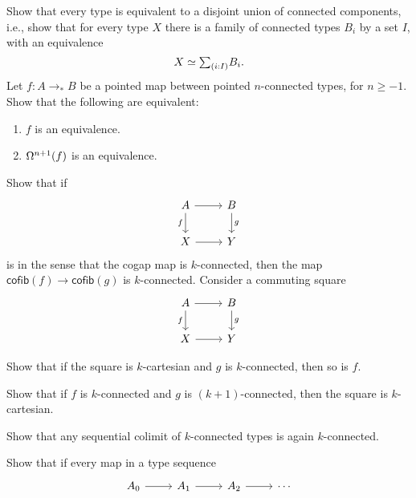 \begin{exercises}
  \exercise Show that every type is equivalent to a disjoint union of connected components, i.e., show that for every type $X$ there is a family of connected types $B_i$ by a set $I$, with an equivalence
  \begin{equation*}
    X \eqvsym \sm{i:I}B_i.
  \end{equation*}
\exercise Let $f:A\to_\ast B$ be a pointed map between pointed $n$-connected types, for $n\geq -1$. Show that the following are equivalent:
\begin{enumerate}
\item $f$ is an equivalence.
\item $\loopspace[n+1]{f}$ is an equivalence. 
\end{enumerate}
\exercise Show that if
\begin{equation*}
\begin{tikzcd}
A \arrow[r] \arrow[d,swap,"f"] & B \arrow[d,"g"] \\
X \arrow[r] & Y
\end{tikzcd}
\end{equation*}
is  in the sense that the cogap map is $k$-connected, then the map $\mathsf{cofib}(f)\to \mathsf{cofib}(g)$ is $k$-connected.
\exercise Consider a commuting square
\begin{equation*}
\begin{tikzcd}
A \arrow[d,swap,"f"] \arrow[r] & B \arrow[d,"g"] \\
X \arrow[r] & Y
\end{tikzcd}
\end{equation*}
\begin{subexenum}
\item Show that if the square is $k$-cartesian and $g$ is $k$-connected, then so is $f$.
\item Show that if $f$ is $k$-connected and $g$ is $(k+1)$-connected, then the square is $k$-cartesian. 
\end{subexenum}
\exercise
\begin{subexenum}
\item Show that any sequential colimit of $k$-connected types is again $k$-connected.
\item Show that if every map in a type sequence
  \begin{equation*}
    \begin{tikzcd}
      A_0\arrow[r] & A_1 \arrow[r] & A_2 \arrow[r] & \cdots
    \end{tikzcd}
  \end{equation*}

\end{subexenum}
\end{exercises}
